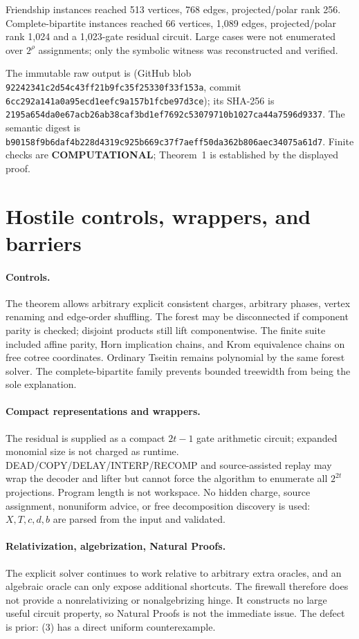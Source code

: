 \documentclass[11pt]{article}
\newcommand{\COMP}{\textbf{COMPUTATIONAL}}
\begin{document}
Friendship instances reached 513 vertices, 768 edges, projected/polar rank
256.  Complete-bipartite instances reached 66 vertices, 1,089 edges,
projected/polar rank 1,024 and a 1,023-gate residual circuit.  Large cases were
not enumerated over $2^\rho$ assignments; only the symbolic witness was
reconstructed and verified.

The immutable raw output is
(GitHub blob \texttt{92242341c2d54c43ff21b9fc35f25330f33f153a}, commit
\texttt{6cc292a141a0a95ecd1eefc9a157b1fcbe97d3ce}); its SHA-256 is
\texttt{2195a654da0e67acb26ab38caf3bd1ef7692c53079710b1027ca44a7596d9337}.
The semantic digest is
\texttt{b90158f9b6daf4b228d4319c925b669c37f7aeff50da362b806aec34075a61d7}.
Finite checks are \COMP{}; Theorem~1 is established by the displayed proof.

\section{Hostile controls, wrappers, and barriers}
\paragraph{Controls.}
The theorem allows arbitrary explicit consistent charges, arbitrary phases,
vertex renaming and edge-order shuffling.  The forest may be disconnected if
component parity is checked; disjoint products still lift componentwise.
The finite suite included affine parity, Horn implication chains, and Krom
equivalence chains on free cotree coordinates.  Ordinary Tseitin remains
polynomial by the same forest solver.  The complete-bipartite family prevents
bounded treewidth from being the sole explanation.

\paragraph{Compact representations and wrappers.}
The residual is supplied as a compact $2t-1$ gate arithmetic circuit; expanded
monomial size is not charged as runtime.  DEAD/COPY/DELAY/INTERP/RECOMP and
source-assisted replay may wrap the decoder and lifter but cannot force the
algorithm to enumerate all $2^{2t}$ projections.  Program length is not
workspace.  No hidden charge, source assignment, nonuniform advice, or free
decomposition discovery is used: $X,T,c,d,b$ are parsed from the input and
validated.

\paragraph{Relativization, algebrization, Natural Proofs.}
The explicit solver continues to work relative to arbitrary extra oracles,
and an algebraic oracle can only expose additional shortcuts.  The firewall
therefore does not provide a nonrelativizing or nonalgebrizing hinge.  It
constructs no large useful circuit property, so Natural Proofs is not the
immediate issue.  The defect is prior: (3) has a direct uniform counterexample.
\end{document}
